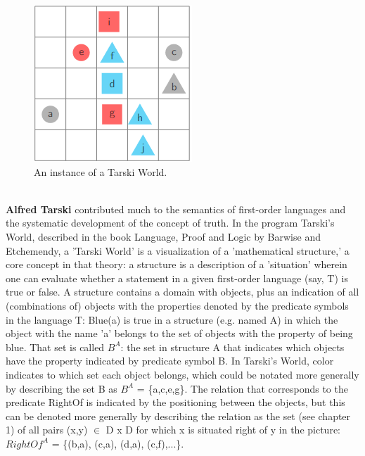 \documentclass[a4paper]{article}
\begin{document}
\begin{figure}[H]
    \centering
    \includegraphics[]{images/tarski-world-example-1.png}
    \caption{An instance of a Tarski World.}
    \label{fig:Tarski}
\end{figure}
\ \\
\textbf{Alfred Tarski} contributed much to the semantics of first-order languages and the systematic development of the concept of truth.
In the program Tarski's World, described in the book Language, Proof and Logic by Barwise and Etchemendy,
a 'Tarski World' is a visualization of a 'mathematical structure,' a core concept in that theory: a structure is a description of a 'situation' wherein one can
evaluate whether a statement in a given first-order language (say, T) is true or false. A structure
contains a domain with objects, plus an indication of all (combinations of) objects with the properties
denoted by the predicate symbols in the language T: Blue(a) is true in a structure (e.g. named A) in
which the object with the name 'a' belongs to the set of objects with the property of being blue. That
set is called $B^A$: the set in structure A that indicates which objects have the property indicated by
predicate symbol B. In Tarski's World, color indicates to which set each object belongs, which could
be notated more generally by describing the set B as $B^A$ = \{a,c,e,g\}. The relation that corresponds
to the predicate RightOf is indicated by the positioning between the objects, but this can be denoted
more generally by describing the relation as the set (see chapter 1) of all pairs (x,y) $\in $ D x D for
which x is situated right of y in the picture: $RightOf^A$ = \{(b,a), (c,a), (d,a), (c,f),...\}.
\end{document}

